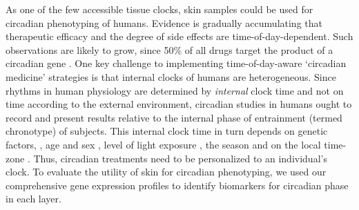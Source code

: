 As one of the few accessible tissue clocks, skin samples could be used for circadian phenotyping of humans. Evidence is gradually accumulating that therapeutic efficacy and the degree of side effects are time-of-day-dependent\cite{Montaigne2018,Dallmann2016,Long2016}. Such observations are likely to grow, since 50\% of all drugs target the product of a circadian gene \cite{Ruben2018, Zhang2014}. One key challenge to implementing time-of-day-aware `circadian medicine' strategies is that internal clocks of humans are heterogeneous. Since rhythms in human physiology are determined by \textit{internal} clock time and not on time according to the external environment, circadian studies in humans ought to record and present results relative to the internal phase of entrainment (termed chronotype) of subjects. This internal clock time in turn depends on genetic factors, \cite{Hsu2015, Brown2008}, age and sex \cite{Roenneberg2007}, level of light exposure \cite{Stothard2017, Wright2013}, the season \cite{Stothard2017, Allebrandt2014} and on the local time-zone \cite{Roenneberg2007}. Thus, circadian treatments need to be personalized to an individual's clock.  To evaluate the utility of skin for circadian phenotyping, we used our comprehensive gene expression profiles to identify biomarkers for circadian phase in each layer. %



